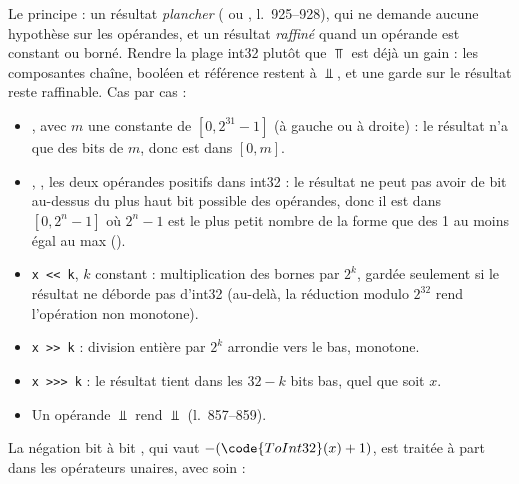 


Le principe : un résultat \emph{plancher} ( ou
, l.~925--928), qui ne demande aucune hypothèse sur les
opérandes, et un résultat \emph{raffiné} quand un opérande est constant ou
borné. Rendre la plage int32 plutôt que $\Top$ est déjà un gain : les
composantes chaîne, booléen et référence restent à $\Bot$, et une garde sur
le résultat reste raffinable. Cas par cas :
\begin{itemize}
  \item {}, avec $m$ une constante de $[0, 2^{31}-1]$ (à gauche ou
    à droite) : le résultat n'a que des bits de $m$, donc est dans $[0, m]$.
  \item {}, , les deux opérandes positifs dans int32 :
    le résultat ne peut pas avoir de bit au-dessus du plus haut bit possible
    des opérandes, donc il est dans $[0, 2^n - 1]$ où $2^n - 1$ est le plus
    petit nombre de la forme \og que des 1\fg{} au moins égal au max
    ().
  \item \texttt{x <{}< k}, $k$ constant : multiplication des bornes par $2^k$,
    gardée seulement si le résultat ne déborde pas d'int32 (au-delà, la
    réduction modulo $2^{32}$ rend l'opération non monotone).
  \item \texttt{x >{}> k} : division entière par $2^k$ arrondie vers le bas,
    monotone.
  \item \texttt{x >{}>{}> k} : le résultat tient dans les $32 - k$ bits bas, quel
    que soit $x$.
  \item Un opérande $\Bot$ rend $\Bot$ (l.~857--859).
\end{itemize}

La négation bit à bit , qui vaut
$-(\code{ToInt32}(x) + 1)$, est traitée à part dans les opérateurs unaires,
avec soin :


